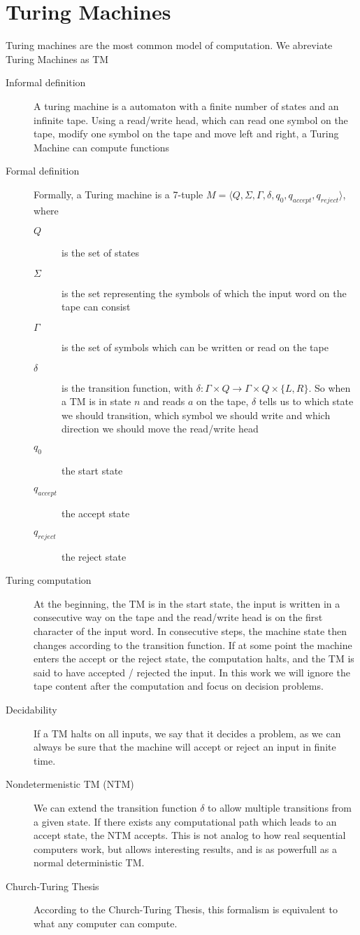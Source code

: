 \section{Turing Machines}\label{sec:turing-machines}
Turing machines are the most common model of computation. We abreviate Turing Machines as TM
\begin{description}
    \item[Informal definition] A turing machine is a automaton with a finite number of states and an infinite tape. Using a read/write head, which can read one symbol on the tape, modify one symbol on the tape and move left and right, a Turing Machine can compute functions
    \item[Formal definition] Formally, a Turing machine is a 7-tuple $M = \langle  Q, \Sigma, \Gamma, \delta, q_0, q_{accept}, q_{reject}\rangle$, where
    \begin{description}
        \item[$Q$] is the set of states
        \item[$\Sigma$] is the set representing the symbols of which the input word on the tape can consist
        \item[$\Gamma$] is the set of symbols which can be written or read on the tape
        \item[$\delta$] is the transition function, with $\delta : \Gamma \times Q \to \Gamma \times Q \times \{L, R\}$. So when a TM is in state $n$ and reads $a$ on the tape, $\delta$ tells us to which state we should transition, which symbol we should write and which direction we should move the read/write head
        \item[$q_0$] the start state
        \item[$q_{accept}$] the accept state
        \item[$q_{reject}$] the reject state
    \end{description}
    \item[Turing computation] At the beginning, the TM is in the start state, the input is written in a consecutive way on the tape and the read/write head is on the first character of the input word. In consecutive steps, the machine state then changes according to the transition function. If at some point the machine enters the accept or the reject state, the computation halts, and the TM is said to have accepted / rejected the input. In this work we will ignore the tape content after the computation and focus on decision problems.
    \item[Decidability] If a TM halts on all inputs, we say that it decides a problem, as we can always be sure that the machine will accept or reject an input in finite time.
    \item[Nondetermenistic TM (NTM)] We can extend the transition function $\delta$ to allow multiple transitions from a given state. If there exists any computational path which leads to an accept state, the NTM accepts. This is not analog to how real sequential computers work, but allows interesting results, and is as powerfull as a normal deterministic TM.
    \item[Church-Turing Thesis] According to the Church-Turing Thesis, this formalism is equivalent to what any computer can compute.
\end{description}

